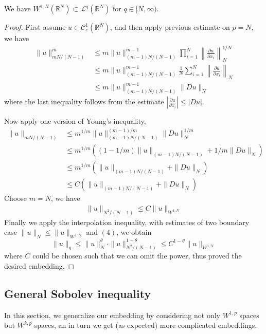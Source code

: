 \documentclass{article}
\begin{document}
\begin{Th} 
    We have $W^{1,N}(\mathbb{R}^N)\subset\mathscr{L}^{q}(\mathbb{R}^N)$ for $q\in[N, \infty)$.
\end{Th}

\begin{proof}
    First assume $u\in\mathscr{C}^{1}_{c}(\mathbb{R}^N)$, and then apply previous estimate on $p=N$, we have
    \begin{align*}
        \|u\|_{mN/(N-1)}^{m}&\leq m\|u\|_{(m-1)N/(N-1)}^{m-1}\prod_{i=1}^{N}\left\|\frac{\partial u}{\partial x_i}\right\|_N^{1/N} \\
        &\leq m\|u\|^{m-1}_{(m-1)N/(N-1)}\frac{1}{N}\sum\limits_{i=1}^{N}\left\|\frac{\partial u}{\partial x_i}\right\|_{N} \\
        &\leq m\|u\|^{m-1}_{(m-1)N/(N-1)}\|Du\|_{N}
    \end{align*}
    where the last inequality follows from the estimate $\left|\frac{\partial u}{\partial x_i}\right|\leq |Du|$.

    Now apply one version of Young's inequality, 
    \begin{align*}
        \|u\|_{mN/(N-1)}&\leq m^{1/m}\|u\|^{(m-1)/m}_{(m-1)N/(N-1)}\|Du\|_{N}^{1/m} \\
        &\leq m^{1/m}\left((1-1/m)\|u\|_{(m-1)N/(N-1)}+1/m\|Du\|_N\right) \\
        &\leq m^{1/m}(\|u\|_{(m-1)N/(N-1)}+\|Du\|_{N}) \\
        &\leq C(\|u\|_{(m-1)N/(N-1)}+\|Du\|_{N}) 
    \end{align*}
    Choose $m=N$, we have 
    \begin{align}
        \|u\|_{N^2/(N-1)}\leq C\|u\|_{W^{1, N}}
    \end{align}
    \indent Finally we apply the interpolation inequality, with estimates of two boundary case $\|u\|_{N}\leq \|u\|_{W^{1, N}}$ and $(4)$, we obtain 
    $$
        \|u\|_{q}\leq\|u\|^\theta_{N}\cdot\|u\|^{1-\theta}_{N^2/(N-1)}\leq C^{1-\theta}\|u\|_{W^{1, N}}
    $$ where $C$ could be chosen such that we can omit the power, thus proved the desired embedding.
\end{proof}

\subsection{General Sobolev inequality}

\indent\indent In this section, we generalize our embedding by considering not only $W^{1, p}$ spaces but $W^{k,p}$ spaces, an in turn we get (as expected) more complicated embeddings. 
\end{document}
